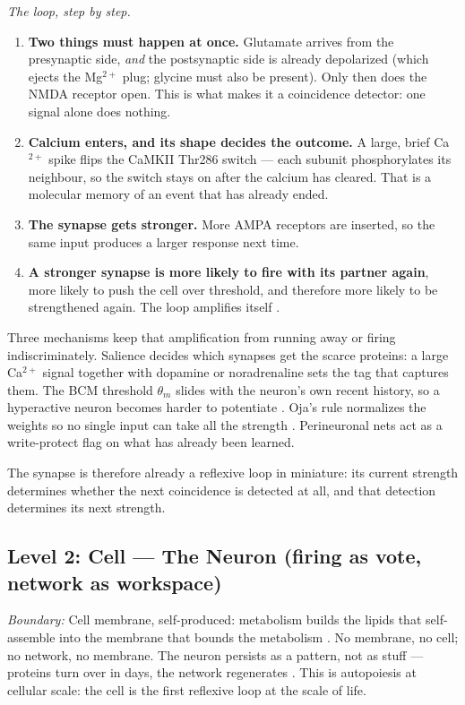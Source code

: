 \documentclass[11pt]{article}
\begin{document}
{\textit{The loop, step by step.}
\begin{enumerate}\itemsep2pt
\item \textbf{Two things must happen at once.} Glutamate arrives from the
presynaptic side, \emph{and} the postsynaptic side is already depolarized
(which ejects the Mg$^{2+}$ plug; glycine must also be present). Only then
does the NMDA receptor open. This is what makes it a coincidence detector:
one signal alone does nothing.
\item \textbf{Calcium enters, and its shape decides the outcome.} A large,
brief Ca$^{2+}$ spike flips the CaMKII Thr286 switch --- each subunit
phosphorylates its neighbour, so the switch stays on after the calcium has
cleared. That is a molecular memory of an event that has already ended.
\item \textbf{The synapse gets stronger.} More AMPA receptors are inserted,
so the same input produces a larger response next time.
\item \textbf{A stronger synapse is more likely to fire with its partner
again}, more likely to push the cell over threshold, and therefore more
likely to be strengthened again. The loop amplifies itself \citep{tononi2014}.
\end{enumerate}

Three mechanisms keep that amplification from running away or firing
indiscriminately. Salience decides which synapses get the scarce proteins:
a large Ca$^{2+}$ signal together with dopamine or noradrenaline sets the
tag that captures them. The BCM threshold $\theta_m$ slides with the
neuron's own recent history, so a hyperactive neuron becomes harder to
potentiate \citep{bienenstock1982}. Oja's rule normalizes the weights so
no single input can take all the strength \citep{oja1982}. Perineuronal
nets act as a write-protect flag on what has already been learned.

The synapse is therefore already a reflexive loop in miniature: its
current strength determines whether the next coincidence is detected at
all, and that detection determines its next strength.

\subsection{Level 2: Cell --- The Neuron (firing as vote, network as workspace)}

\textit{Boundary:} Cell membrane, self-produced: metabolism builds the lipids that self-assemble into the membrane that bounds the metabolism \citep{maturana1980}. No membrane, no cell; no network, no membrane. The neuron persists as a pattern, not as stuff --- proteins turn over in days, the network regenerates \citep{maturana1980}. This is autopoiesis at cellular scale: the cell is the first reflexive loop at the scale of life.

}
\end{document}
